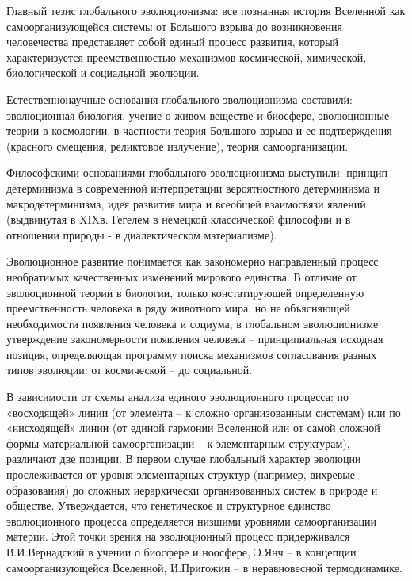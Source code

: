 \documentclass[exam_answers.tex]{subfiles}
\begin{document}
\renewcommand{\baselinestretch}{\blch}

Главный тезис глобального эволюционизма: все познанная история
Вселенной как самоорганизующейся системы от Большого взрыва до
возникновения человечества представляет собой единый процесс развития,
который характеризуется преемственностью механизмов космической,
химической, биологической и социальной эволюции.

Естественнонаучные основания глобального эволюционизма составили:
эволюционная биология, учение о живом веществе и биосфере, эволюционные
теории в космологии, в частности теория Большого взрыва и ее подтверждения
(красного смещения, реликтовое излучение), теория самоорганизации.

Философскими основаниями глобального эволюционизма выступили:
принцип детерминизма в современной интерпретации вероятностного
детерминизма и макродетерминизма, идея развития мира и всеобщей
взаимосвязи явлений (выдвинутая в XIXв. Гегелем в немецкой классической
философии и в отношении природы - в диалектическом материализме).

Эволюционное развитие понимается как закономерно направленный
процесс необратимых качественных изменений мирового единства. В отличие
от эволюционной теории в биологии, только констатирующей определенную
преемственность человека в ряду животного мира, но не объясняющей
необходимости появления человека и социума, в глобальном эволюционизме
утверждение закономерности появления человека – принципиальная исходная
позиция, определяющая программу поиска механизмов согласования разных
типов эволюции: от космической – до социальной.

В зависимости от схемы анализа единого эволюционного процесса: по
«восходящей» линии (от элемента – к сложно организованным системам) или
по «нисходящей» линии (от единой гармонии Вселенной или от самой сложной
формы материальной самоорганизации – к элементарным структурам), -
различают две позиции.
В первом случае глобальный характер эволюции
прослеживается от уровня элементарных структур (например, вихревые
образования) до сложных иерархически организованных систем в природе и
обществе. Утверждается, что генетическое и структурное единство
эволюционного процесса определяется низшими уровнями самоорганизации
материи. Этой точки зрения на эволюционный процесс придерживался
В.И.Вернадский в учении о биосфере и ноосфере, Э.Янч – в концепции
самоорганизующейся Вселенной, И.Пригожин – в неравновесной
термодинамике.
\end{document}
